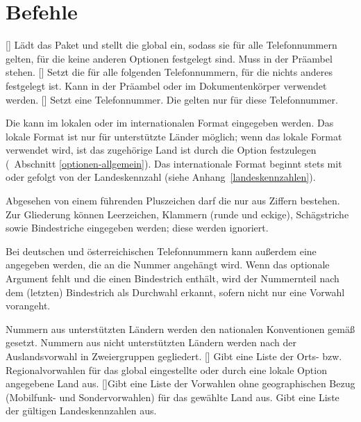 \documentclass[numbers=noenddot]{scrreprt}
\newcommand*\vglAbschnitt[1]{(\cf\ Abschnitt \ref{#1})}
\newcommand*\sieheAnhang[1]{(siehe Anhang~\ref{#1})}
\begin{document}
\section{Befehle}
\begin{Befehlsliste}
[]
Lädt das Paket und stellt die  global ein, sodass sie für alle Telefonnummern gelten, für die keine anderen Optionen festgelegt sind. Muss in der Präambel stehen.
[]
Setzt die  für alle folgenden Telefonnummern, für die nichts anderes festgelegt ist. Kann in der Präambel oder im Dokumentenkörper verwendet werden.
[]
Setzt eine Telefonnummer. Die  gelten nur für diese Telefonnummer.

Die  kann im lokalen oder im internationalen Format eingegeben werden. Das lokale Format ist nur für unterstützte Länder möglich; wenn das lokale Format verwendet wird, ist das zugehörige Land ist durch die Option
festzulegen
\vglAbschnitt{optionen-allgemein}.
Das internationale Format beginnt stets mit
\code{+}
oder
gefolgt von der Landeskennzahl
\sieheAnhang{landeskennzahlen}.

Abgesehen von einem führenden Pluszeichen darf die  nur aus Ziffern bestehen. Zur Gliederung können Leerzeichen, Klammern (runde und eckige), Schägstriche sowie Bindestriche eingegeben werden; diese werden ignoriert.

Bei deutschen und österreichischen Telefonnummern kann außerdem eine  angegeben werden, die an die Nummer angehängt wird. Wenn das optionale Argument fehlt und die  einen Bindestrich enthält, wird der Nummernteil nach dem (letzten) Bindestrich als Durchwahl erkannt, sofern nicht nur eine Vorwahl vorangeht.

Nummern aus unterstützten Ländern werden den nationalen Konventionen gemäß gesetzt. Nummern aus nicht unterstützten Ländern werden nach der Auslandsvorwahl in Zweiergruppen gegliedert.
[]
Gibt eine Liste der Orts- bzw. Regionalvorwahlen für das global eingestellte oder durch eine lokale Option angegebene Land aus.
[]{Gibt eine Liste der Vorwahlen ohne geographischen Bezug (Mobilfunk- und Sondervorwahlen) für das gewählte Land aus.}
Gibt eine Liste der gültigen Landeskennzahlen aus.
\end{Befehlsliste}
\end{document}
